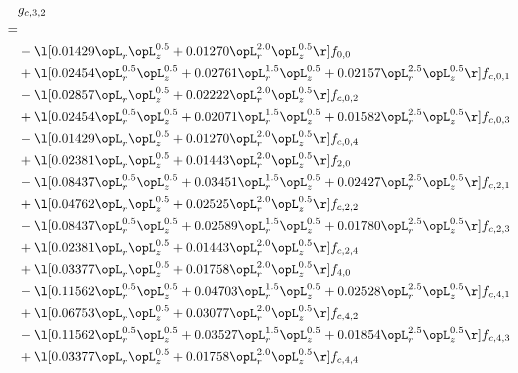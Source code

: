 \begin{alignat}{2} 
\label{eq:g_32_0} 
& g_{c,3,2} \nonumber \\ 
 = \\ 
& - \l[  0.01429 \opL_r \opL_z^{0.5} +  0.01270 \opL_r^{2.0} \opL_z^{0.5}  \r] f_{0,0} \nonumber \\ 
& + \l[  0.02454 \opL_r^{0.5} \opL_z^{0.5} +  0.02761 \opL_r^{1.5} \opL_z^{0.5} +  0.02157 \opL_r^{2.5} \opL_z^{0.5}  \r] f_{c,0,1} \nonumber \\ 
& - \l[  0.02857 \opL_r \opL_z^{0.5} +  0.02222 \opL_r^{2.0} \opL_z^{0.5}  \r] f_{c,0,2} \nonumber \\ 
& + \l[  0.02454 \opL_r^{0.5} \opL_z^{0.5} +  0.02071 \opL_r^{1.5} \opL_z^{0.5} +  0.01582 \opL_r^{2.5} \opL_z^{0.5}  \r] f_{c,0,3} \nonumber \\ 
& - \l[  0.01429 \opL_r \opL_z^{0.5} +  0.01270 \opL_r^{2.0} \opL_z^{0.5}  \r] f_{c,0,4} \nonumber \\ 
& + \l[  0.02381 \opL_r \opL_z^{0.5} +  0.01443 \opL_r^{2.0} \opL_z^{0.5}  \r] f_{2,0} \nonumber \\ 
& - \l[  0.08437 \opL_r^{0.5} \opL_z^{0.5} +  0.03451 \opL_r^{1.5} \opL_z^{0.5} +  0.02427 \opL_r^{2.5} \opL_z^{0.5}  \r] f_{c,2,1} \nonumber \\ 
& + \l[  0.04762 \opL_r \opL_z^{0.5} +  0.02525 \opL_r^{2.0} \opL_z^{0.5}  \r] f_{c,2,2} \nonumber \\ 
& - \l[  0.08437 \opL_r^{0.5} \opL_z^{0.5} +  0.02589 \opL_r^{1.5} \opL_z^{0.5} +  0.01780 \opL_r^{2.5} \opL_z^{0.5}  \r] f_{c,2,3} \nonumber \\ 
& + \l[  0.02381 \opL_r \opL_z^{0.5} +  0.01443 \opL_r^{2.0} \opL_z^{0.5}  \r] f_{c,2,4} \nonumber \\ 
& + \l[  0.03377 \opL_r \opL_z^{0.5} +  0.01758 \opL_r^{2.0} \opL_z^{0.5}  \r] f_{4,0} \nonumber \\ 
& - \l[  0.11562 \opL_r^{0.5} \opL_z^{0.5} +  0.04703 \opL_r^{1.5} \opL_z^{0.5} +  0.02528 \opL_r^{2.5} \opL_z^{0.5}  \r] f_{c,4,1} \nonumber \\ 
& + \l[  0.06753 \opL_r \opL_z^{0.5} +  0.03077 \opL_r^{2.0} \opL_z^{0.5}  \r] f_{c,4,2} \nonumber \\ 
& - \l[  0.11562 \opL_r^{0.5} \opL_z^{0.5} +  0.03527 \opL_r^{1.5} \opL_z^{0.5} +  0.01854 \opL_r^{2.5} \opL_z^{0.5}  \r] f_{c,4,3} \nonumber \\ 
& + \l[  0.03377 \opL_r \opL_z^{0.5} +  0.01758 \opL_r^{2.0} \opL_z^{0.5}  \r] f_{c,4,4} \nonumber \\ 
\end{alignat} 


